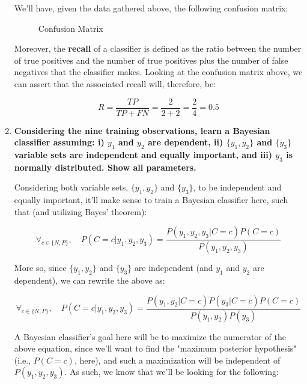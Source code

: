 \documentclass[12pt]{article}
\begin{document}
\begin{enumerate}[leftmargin=\labelsep]
        We'll have, given the data gathered above, the following confusion matrix:

        \begin{figure}[H]
          \centering
          
          \caption{Confusion Matrix}
        \end{figure}

        Moreover, the \textbf{recall} of a classifier is defined as the ratio between the number of
        true positives and the number of true positives plus the number of false negatives that the
        classifier makes. Looking at the confusion matrix above, we can assert that the associated
        recall will, therefore, be:

        $$
          R = \frac{TP}{TP + FN} = \frac{2}{2 + 2} = \frac{2}{4} = 0.5
        $$

        \pagebreak

  \item \textbf{Considering the nine training observations, learn a Bayesian classifier assuming:
          i) $y_1$ and $y_2$ are dependent, ii) $\{y_1 , y_2\}$ and $\{y_3 \}$ variable sets are
          independent and equally important, and iii) $y_3$ is normally distributed. Show all parameters.}

        Considering both variable sets, $\{y_1, y_2\}$ and $\{y_3\}$, to be independent and equally important,
        it'll make sense to train a Bayesian classifier here, such that (and utilizing
        Bayes' theorem):

        \begin{equation} \label{eq:classifier}
          \forall_{c \in \{N, P\}},\quad P(C = c | y_1, y_2, y_3) = \frac{P(y_1, y_2, y_3 | C = c) P(C = c)}{P(y_1, y_2, y_3)}
        \end{equation}

        More so, since $\{y_1, y_2\}$ and $\{y_3\}$ are independent (and $y_1$ and $y_2$ are dependent),
        we can rewrite the above as:

        \begin{equation} \label{eq:classifier-expanded}
          \forall_{c \in \{N, P\}},\quad P(C = c | y_1, y_2, y_3) = \frac{P(y_1, y_2 | C = c) P(y_3 | C = c) P(C = c)}{P(y_1, y_2) P(y_3)}
        \end{equation}

        A Bayesian classifier's goal here will be to maximize the numerator of the above equation,
        since we'll want to find the "maximum posterior hypothesis" (i.e., $P(C = c)$, here), and
        such a maximization will be independent of $P(y_1, y_2, y_3)$. As such, we know that
        we'll be looking for the following:


\end{enumerate}
\end{document}
